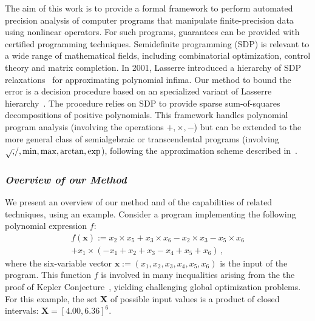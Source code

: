 \documentclass[preprint]{sigplanconf}
\newcommand{\x}{\mathbf{x}}
\def\X{\mathbf{X}}
\theoremstyle{plain}
\begin{document}
The aim of this work is to provide a formal framework to perform automated precision analysis of computer programs that manipulate finite-precision data using nonlinear operators. For such programs, guarantees can be provided with certified programming techniques.
Semidefinite programming (SDP) is relevant to a wide range of mathematical fields, including combinatorial optimization, control theory and matrix completion. In 2001, Lasserre introduced a hierarchy of SDP relaxations~\cite{Lasserre01moments} for approximating polynomial infima. Our method to bound the error is a decision procedure based on an specialized variant of Lasserre hierarchy~\cite{Las06SparseSOS}. The procedure relies on SDP to provide sparse sum-of-squares decompositions of positive polynomials. This framework handles polynomial program analysis (involving the operations $+,\times,-$) but can be extended to the more general class of semialgebraic or transcendental programs (involving $\sqrtsign, /, \min, \max, \arctan, \exp$), following the approximation scheme described in~\cite{Magron15sdp}.
%
\subsubsection*{\textit{Overview of our Method}} 
%
We present an overview of our method and of the capabilities of related techniques, using an example.
Consider a program implementing the following polynomial expression $f$:
\begin{align*}
f(\x) := x_2 \times x_5 + x_3 \times x_6 - x_2 \times x_3  - x_5 \times x_6 \\
+ x_1 \times ( - x_1 +  x_2 +  x_3  - x_4 +  x_5 +  x_6) \,,
\end{align*}
%
where the six-variable vector $\x :=  (x_1, x_2, x_3, x_4, x_5, x_6)$ is the input of the program. 
This function $f$ is involved in many inequalities arising from the the proof of Kepler Conjecture~\cite{halesalgo}, yielding challenging global optimization problems.
For this example, the set $\X$ of possible input values is a product of closed intervals: $\X = [4.00, 6.36]^6$.
\end{document}
